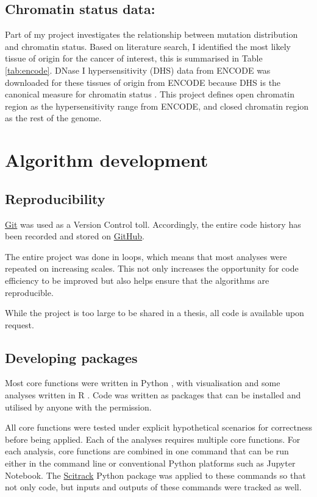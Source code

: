 \subsection{Chromatin status data:} 
Part of my project investigates the relationship between mutation distribution and chromatin status. Based on literature search, I identified the most likely tissue of origin for the cancer of interest, this is summarised in Table \ref{tab:encode}. DNase I hypersensitivity (DHS) data from ENCODE was downloaded for these tissues of origin from ENCODE because DHS is the canonical measure for chromatin status \citep{Thurman2012TheGenome,Klemm2019ChromatinEpigenome}. This project defines open chromatin region as the hypersensitivity range from ENCODE, and closed chromatin region as the rest of the genome.

\section{Algorithm development}
\subsection{Reproducibility} 
\href{http://git-scm.com}{Git} was used as a Version Control toll. Accordingly, the entire code history has been recorded and stored on \href{https://github.com}{GitHub}.

The entire project was done in loops, which means that most analyses were repeated on increasing scales. This not only increases the opportunity for code efficiency to be improved but also helps ensure that the algorithms are reproducible. 

While the project is too large to be shared in a thesis, all code is available upon request. 

\subsection{Developing packages}
Most core functions were written in Python \citep{van1995python}, with visualisation and some analyses written in R \citep{r}. Code was written as packages that can be installed and utilised by anyone with the permission. 

All core functions were tested under explicit hypothetical scenarios for correctness before being applied. Each of the analyses requires multiple core functions. For each analysis, core functions are combined in one command that can be run either in the command line or conventional Python platforms such as Jupyter Notebook. The \href{https://github.com/HuttleyLab/scitrack}{Scitrack} Python package was applied to these commands so that not only code, but inputs and outputs of these commands were tracked as well.

